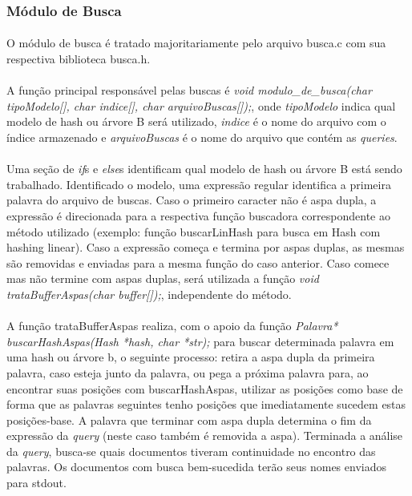\documentclass[12pt,a4paper]{article}
\begin{document}
   \subsubsection{Módulo de Busca}
    {\paragraph{} O módulo de busca é tratado majoritariamente pelo arquivo busca.c com sua respectiva biblioteca busca.h.}
    {\paragraph{} A função principal responsável pelas buscas é \emph{void modulo\_de\_busca(char tipoModelo[], char indice[], char arquivoBuscas[]);}, onde \emph{tipoModelo} indica qual modelo de hash ou árvore B será utilizado, \emph{indice} é o nome do arquivo com o índice armazenado e \emph{arquivoBuscas} é o nome do arquivo que contém as \emph{queries}.}
    {\paragraph{} Uma seção de \emph{if}s e \emph{else}s identificam qual modelo de hash ou árvore B está sendo trabalhado. Identificado o modelo, uma expressão regular identifica a primeira palavra do arquivo de buscas. Caso o primeiro caracter não é aspa dupla, a expressão é direcionada para a respectiva função buscadora correspondente ao método utilizado (exemplo: função buscarLinHash para busca em Hash com hashing linear). Caso a expressão começa e termina por aspas duplas, as mesmas são removidas e enviadas para a mesma função do caso anterior. Caso comece mas não termine com aspas duplas, será utilizada a função \emph{void trataBufferAspas(char buffer[]);}, independente do método.}
    {\paragraph{} A função trataBufferAspas realiza, com o apoio da função \emph{Palavra* buscarHashAspas(Hash *hash, char *str);} para buscar determinada palavra em uma hash ou árvore b, o seguinte processo: retira a aspa dupla da primeira palavra, caso esteja junto da palavra, ou pega a próxima palavra para, ao encontrar suas posições com buscarHashAspas, utilizar as posições como base de forma que as palavras seguintes tenho posições que imediatamente sucedem estas posições-base. A palavra que terminar com aspa dupla determina o fim da expressão da \emph{query} (neste caso também é removida a aspa). Terminada a análise da \emph{query}, busca-se quais documentos tiveram continuidade no encontro das palavras. Os documentos com busca bem-sucedida terão seus nomes enviados para stdout. }
   
\end{document}

